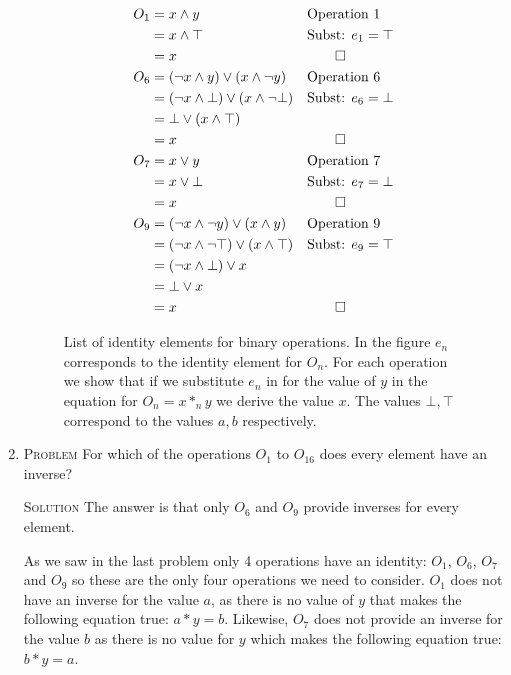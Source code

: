 \documentclass[draft,twoside]{amsart}
\newcommand{\Solution}{\textsc{Solution}\xspace}
\newcommand{\Problem}{\textsc{Problem}\xspace}
\newcommand{\ltrue}{\top}
\newcommand{\lfalse}{\bot}
\begin{document}
\begin{enumerate}
   \begin{figure}
      \caption{List of identity elements for binary operations. In the figure
      $e_n$ corresponds to the identity element for $O_n$. For each operation
      we show that if we substitute $e_n$ in for the value of $y$ in the 
      equation for $O_n = x *_n y$ we derive the value $x$. The values
      $\lfalse, \ltrue$ correspond to the values $a, b$ respectively.}
      \label{fig:bool_ids}
      \begin{align*}
      O_1&=  x \land y  && \text{Operation 1}    \\
	 & = x \land \ltrue  && \text{Subst: } e_1 = \ltrue \\
	 & = x               && \qed                  \\
      O_6& = (\lnot x \land y) \lor (x \land \lnot y)
	                     && \text{Operation 6}    \\
	 & = (\lnot x \land \lfalse) \lor (x \land \lnot \lfalse)
	                     && \text{Subst: } e_6 = \lfalse \\
	 & = \lfalse \lor (x \land \ltrue)            \\
	 & = x               && \qed                  \\
      O_7& = x \lor y    && \text{Operation 7}    \\
	 & = x \lor \lfalse  && \text{Subst: } e_7 = \lfalse\\
	 & = x               && \qed                  \\
      O_9& = (\lnot x \land \lnot y) \lor (x \land y)
	                     && \text{Operation 9}    \\
	 & = (\lnot x \land \lnot \ltrue) \lor (x \land \ltrue)
	                     && \text{Subst: } e_9 = \ltrue \\
	 & = (\lnot x \land \lfalse) \lor x           \\
	 & = \lfalse \lor x                           \\
	 & = x               && \qed
      \end{align*}
   \end{figure}

   \item \Problem For which of the operations $O_1$ to $O_{16}$ does
   every element have an inverse?

   \noindent \Solution The answer is that only $O_6$ and $O_9$ provide
   inverses for every element.
   
   As we saw in the last problem only 4 operations
   have an identity: $O_1$, $O_6$, $O_7$ and $O_9$ so these are the only
   four operations we need to consider. $O_1$ does not have an inverse 
   for the value $a$, as there is no value of $y$ that makes the following
   equation true: $a * y = b$. Likewise, $O_7$ does not provide an inverse
   for the value $b$ as there is no value for $y$ which makes the 
   following equation true: $b * y = a$. 
   

\end{enumerate}
\end{document}
